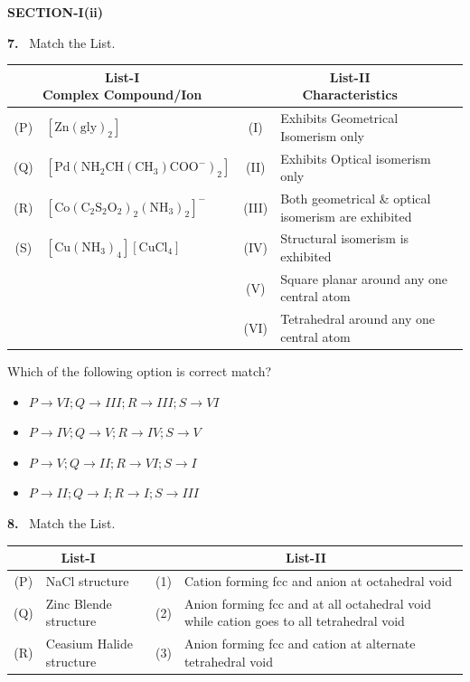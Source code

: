 \documentclass[10pt]{extarticle}
\newcommand{\sect}[1]{\par\smallskip\noindent\textbf{#1}\par}
\newcommand{\qn}[1]{\par\smallskip\noindent\textbf{#1.}~}
\newenvironment{qoptions}{\begin{itemize}[leftmargin=1.8em,itemsep=1pt,topsep=2pt,label={}]}{\end{itemize}}
\newcommand{\opt}[2]{\item[(#1)] #2}
\begin{document}
\begin{multicols}{2}
\sect{SECTION-I(ii)}
\qn{7} Match the List.
\begin{center}\footnotesize\renewcommand{\arraystretch}{1.1}\setlength{\extrarowheight}{3.5pt}\setlength{\tabcolsep}{2pt}
\begin{tabular}{|c|l|c|l|}
\hline
\multicolumn{2}{|c|}{\parbox[t]{2.8cm}{\centering List-I\\ Complex Compound/Ion}} & \multicolumn{2}{c|}{\parbox[t]{2.8cm}{\centering List-II\\ Characteristics}}\\[3pt]
\hline
(P) & $[\mathrm{Zn(gly)_2}]$ & (I) & \parbox[t]{2.6cm}{Exhibits Geometrical Isomerism only}\\[3pt]
(Q) & $[\mathrm{Pd(NH_2CH(CH_3)COO^-)_2}]$ & (II) & \parbox[t]{2.6cm}{Exhibits Optical isomerism only}\\[3pt]
(R) & $[\mathrm{Co(C_2S_2O_2)_2(NH_3)_2}]^-$ & (III) & \parbox[t]{2.6cm}{Both geometrical \& optical isomerism are exhibited}\\[3pt]
(S) & $[\mathrm{Cu(NH_3)_4}][\mathrm{CuCl_4}]$ & (IV) & \parbox[t]{2.6cm}{Structural isomerism is exhibited}\\[3pt]
 & & (V) & \parbox[t]{2.6cm}{Square planar around any one central atom}\\[3pt]
 & & (VI) & \parbox[t]{2.6cm}{Tetrahedral around any one central atom}\\[3pt]
\hline
\end{tabular}
\end{center}
Which of the following option is correct match?
\begin{qoptions}
\opt{A}{$P\to VI;Q\to III;R\to III;S\to VI$}
\opt{B}{$P\to IV;Q\to V;R\to IV;S\to V$}
\opt{C}{$P\to V;Q\to II;R\to VI;S\to I$}
\opt{D}{$P\to II;Q\to I;R\to I;S\to III$}
\end{qoptions}
\qn{8} Match the List.
\begin{center}\footnotesize\renewcommand{\arraystretch}{1.1}\setlength{\extrarowheight}{3.5pt}\setlength{\tabcolsep}{2pt}
\begin{tabular}{|c|l|c|l|}
\hline
\multicolumn{2}{|c|}{List-I} & \multicolumn{2}{c|}{List-II}\\[3pt]
\hline
(P) & NaCl structure & (1) & \parbox[t]{3.1cm}{Cation forming fcc and anion at octahedral void}\\[3pt]
(Q) & Zinc Blende structure & (2) & \parbox[t]{3.1cm}{Anion forming fcc and at all octahedral void while cation goes to all tetrahedral void}\\[3pt]
(R) & Ceasium Halide structure & (3) & \parbox[t]{3.1cm}{Anion forming fcc and cation at alternate tetrahedral void}\\[3pt]

\end{tabular}
\end{center}
\end{multicols}
\end{document}
